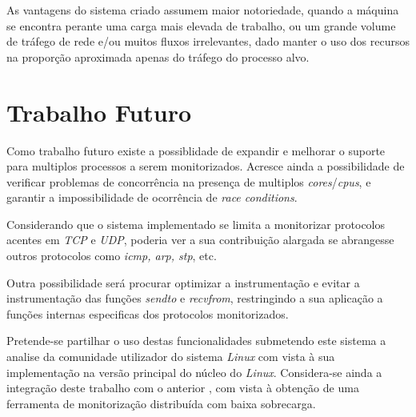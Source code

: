 As vantagens do sistema criado assumem maior notoriedade, quando a máquina se encontra perante uma carga mais elevada de trabalho, ou um grande volume de tráfego de rede e/ou muitos fluxos irrelevantes, dado manter o uso dos recursos na proporção aproximada apenas do tráfego do processo alvo.

\section{Trabalho Futuro}
\label{sec:future_work}
Como trabalho futuro existe a possiblidade de expandir e melhorar o suporte para multiplos processos a serem monitorizados.
Acresce ainda a possibilidade de verificar problemas de concorrência na presença de multiplos \textit{cores}/\textit{cpus}, e garantir a impossibilidade de ocorrência de \textit{race conditions}.

Considerando que o sistema implementado se limita a monitorizar protocolos acentes em \textit{TCP} e \textit{UDP}, poderia ver a sua contribuição alargada se abrangesse outros protocolos como \textit{icmp, arp, stp}, etc.

Outra possibilidade será procurar optimizar a instrumentação e evitar a instrumentação das funções \textit{sendto} e \textit{recvfrom}, restringindo a sua aplicação a funções internas especificas dos protocolos monitorizados.

Pretende-se partilhar o uso destas funcionalidades submetendo este sistema a analise da comunidade utilizador do sistema \textit{Linux} com vista à sua implementação na versão principal do núcleo do \textit{Linux}.
Considera-se ainda a integração deste trabalho com o anterior \cite{duarte10,Farruca:2009}, com vista à obtenção de uma ferramenta de monitorização distribuída com baixa sobrecarga.
